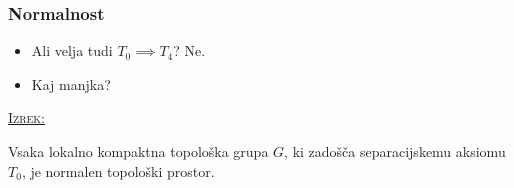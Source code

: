\documentclass[a4paper, 12pt]{beamer}
\newenvironment{matematika}[1]{
\textcolor{bostonuniversityred}{\underline{\textsc{#1:}}}
}{
}
\begin{document}
\begin{frame}
\frametitle{Normalnost}
\begin{itemize}[label=]
\item Ali velja tudi $T_0 \implies T_4$? \pause Ne. \pause
\item Kaj manjka? \newline \pause
\end{itemize}

\begin{matematika}{Izrek}
Vsaka lokalno kompaktna topološka grupa $G$, ki zadošča separacijskemu aksiomu $T_0$, je normalen topološki prostor.
\end{matematika}
\end{frame}
\end{document}
